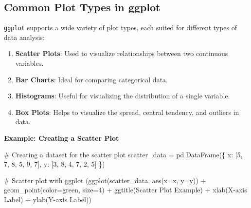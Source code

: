 \documentclass[
  letterpaper,
  DIV=11,
  numbers=noendperiod]{scrreprt}
\newenvironment{Shaded}{\begin{snugshade}}{\end{snugshade}}
\newcommand{\CommentTok}[1]{\textcolor[rgb]{0.37,0.37,0.37}{#1}}
\newcommand{\DecValTok}[1]{\textcolor[rgb]{0.68,0.00,0.00}{#1}}
\newcommand{\NormalTok}[1]{\textcolor[rgb]{0.00,0.23,0.31}{#1}}
\newcommand{\OperatorTok}[1]{\textcolor[rgb]{0.37,0.37,0.37}{#1}}
\newcommand{\StringTok}[1]{\textcolor[rgb]{0.13,0.47,0.30}{#1}}
\providecommand{\tightlist}{%
  \setlength{\itemsep}{0pt}\setlength{\parskip}{0pt}}\usepackage{longtable,booktabs,array}
\begin{document}
\hypertarget{common-plot-types-in-ggplot}{%
\subsection{Common Plot Types in
ggplot}\label{common-plot-types-in-ggplot}}

\texttt{ggplot} supports a wide variety of plot types, each suited for
different types of data analysis:

\begin{enumerate}
\def\labelenumi{\arabic{enumi}.}
\tightlist
\item
  \textbf{Scatter Plots}: Used to visualize relationships between two
  continuous variables.
\item
  \textbf{Bar Charts}: Ideal for comparing categorical data.
\item
  \textbf{Histograms}: Useful for visualizing the distribution of a
  single variable.
\item
  \textbf{Box Plots}: Helps to visualize the spread, central tendency,
  and outliers in data.
\end{enumerate}

\textbf{Example: Creating a Scatter Plot}

\begin{Shaded}
\begin{Highlighting}[]
\CommentTok{\# Creating a dataset for the scatter plot}
\NormalTok{scatter\_data }\OperatorTok{=}\NormalTok{ pd.DataFrame(\{}
    \StringTok{\textquotesingle{}x\textquotesingle{}}\NormalTok{: [}\DecValTok{5}\NormalTok{, }\DecValTok{7}\NormalTok{, }\DecValTok{8}\NormalTok{, }\DecValTok{5}\NormalTok{, }\DecValTok{9}\NormalTok{, }\DecValTok{7}\NormalTok{],}
    \StringTok{\textquotesingle{}y\textquotesingle{}}\NormalTok{: [}\DecValTok{3}\NormalTok{, }\DecValTok{8}\NormalTok{, }\DecValTok{4}\NormalTok{, }\DecValTok{7}\NormalTok{, }\DecValTok{2}\NormalTok{, }\DecValTok{5}\NormalTok{]}
\NormalTok{\})}

\CommentTok{\# Scatter plot with ggplot}
\NormalTok{(ggplot(scatter\_data, aes(x}\OperatorTok{=}\StringTok{\textquotesingle{}x\textquotesingle{}}\NormalTok{, y}\OperatorTok{=}\StringTok{\textquotesingle{}y\textquotesingle{}}\NormalTok{)) }\OperatorTok{+}
\NormalTok{ geom\_point(color}\OperatorTok{=}\StringTok{\textquotesingle{}green\textquotesingle{}}\NormalTok{, size}\OperatorTok{=}\DecValTok{4}\NormalTok{) }\OperatorTok{+}
\NormalTok{ ggtitle(}\StringTok{\textquotesingle{}Scatter Plot Example\textquotesingle{}}\NormalTok{) }\OperatorTok{+}
\NormalTok{ xlab(}\StringTok{\textquotesingle{}X{-}axis Label\textquotesingle{}}\NormalTok{) }\OperatorTok{+}
\NormalTok{ ylab(}\StringTok{\textquotesingle{}Y{-}axis Label\textquotesingle{}}\NormalTok{))}
\end{Highlighting}
\end{Shaded}
\end{document}
